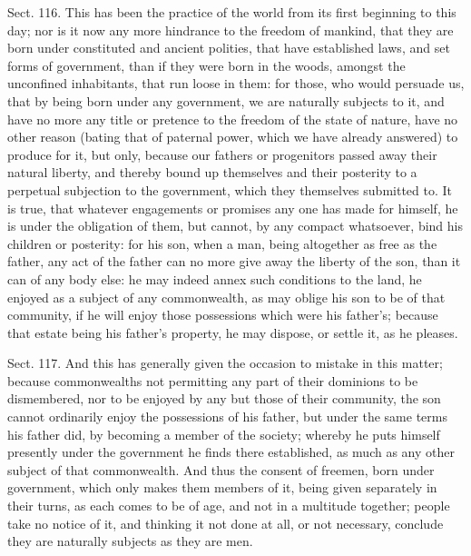 \documentclass[11pt,openany]{book}
\begin{document}
Sect. 116. This has been the practice of the world from its first beginning to this day; nor is it now any more hindrance to the freedom of mankind, that they are born under constituted and ancient polities, that have established laws, and set forms of government, than if they were born in the woods, amongst the unconfined inhabitants, that run loose in them: for those, who would persuade us, that by being born under any government, we are naturally subjects to it, and have no more any title or pretence to the freedom of the state of nature, have no other reason (bating that of paternal power, which we have already answered) to produce for it, but only, because our fathers or progenitors passed away their natural liberty, and thereby bound up themselves and their posterity to a perpetual subjection to the government, which they themselves submitted to. It is true, that whatever engagements or promises any one has made for himself, he is under the obligation of them, but cannot, by any compact whatsoever, bind his children or posterity: for his son, when a man, being altogether as free as the father, any act of the father can no more give away the liberty of the son, than it can of any body else: he may indeed annex such conditions to the land, he enjoyed as a subject of any commonwealth, as may oblige his son to be of that community, if he will enjoy those possessions which were his father's; because that estate being his father's property, he may dispose, or settle it, as he pleases.

Sect. 117. And this has generally given the occasion to mistake in this matter; because commonwealths not permitting any part of their dominions to be dismembered, nor to be enjoyed by any but those of their community, the son cannot ordinarily enjoy the possessions of his father, but under the same terms his father did, by becoming a member of the society; whereby he puts himself presently under the government he finds there established, as much as any other subject of that commonwealth. And thus the consent of freemen, born under government, which only makes them members of it, being given separately in their turns, as each comes to be of age, and not in a multitude together; people take no notice of it, and thinking it not done at all, or not necessary, conclude they are naturally subjects as they are men.
\end{document}
